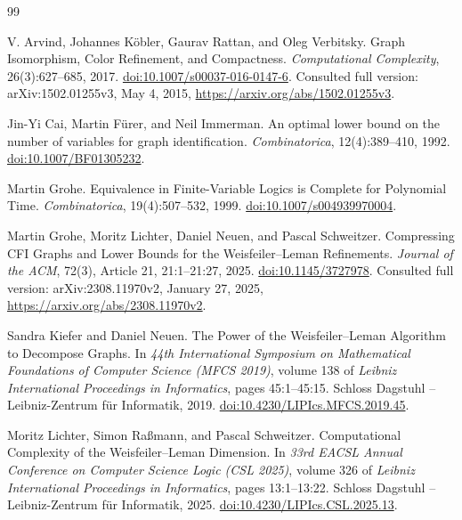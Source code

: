 \begin{thebibliography}{99}

V. Arvind, Johannes K\"obler, Gaurav Rattan, and Oleg Verbitsky.
\newblock Graph Isomorphism, Color Refinement, and Compactness.
\newblock \emph{Computational Complexity}, 26(3):627--685, 2017.
\newblock
\href{https://doi.org/10.1007/s00037-016-0147-6}{doi:10.1007/s00037-016-0147-6}.
\newblock Consulted full version: arXiv:1502.01255v3, May 4, 2015,
\url{https://arxiv.org/abs/1502.01255v3}.

Jin-Yi Cai, Martin F\"urer, and Neil Immerman.
\newblock An optimal lower bound on the number of variables for graph
identification.
\newblock \emph{Combinatorica}, 12(4):389--410, 1992.
\newblock \href{https://doi.org/10.1007/BF01305232}{doi:10.1007/BF01305232}.

Martin Grohe.
\newblock Equivalence in Finite-Variable Logics is Complete for
Polynomial Time.
\newblock \emph{Combinatorica}, 19(4):507--532, 1999.
\newblock
\href{https://doi.org/10.1007/s004939970004}{doi:10.1007/s004939970004}.

Martin Grohe, Moritz Lichter, Daniel Neuen, and Pascal Schweitzer.
\newblock Compressing CFI Graphs and Lower Bounds for the
Weisfeiler--Leman Refinements.
\newblock \emph{Journal of the ACM}, 72(3), Article 21, 21:1--21:27, 2025.
\newblock \href{https://doi.org/10.1145/3727978}{doi:10.1145/3727978}.
\newblock Consulted full version: arXiv:2308.11970v2, January 27, 2025,
\url{https://arxiv.org/abs/2308.11970v2}.

Sandra Kiefer and Daniel Neuen.
\newblock The Power of the Weisfeiler--Leman Algorithm to Decompose Graphs.
\newblock In \emph{44th International Symposium on Mathematical Foundations
of Computer Science (MFCS 2019)}, volume 138 of \emph{Leibniz International
Proceedings in Informatics}, pages 45:1--45:15.
Schloss Dagstuhl -- Leibniz-Zentrum f\"ur Informatik, 2019.
\newblock
\href{https://doi.org/10.4230/LIPIcs.MFCS.2019.45}{doi:10.4230/LIPIcs.MFCS.2019.45}.

Moritz Lichter, Simon Ra\ss mann, and Pascal Schweitzer.
\newblock Computational Complexity of the Weisfeiler--Leman Dimension.
\newblock In \emph{33rd EACSL Annual Conference on Computer Science Logic
(CSL 2025)}, volume 326 of \emph{Leibniz International Proceedings in
Informatics}, pages 13:1--13:22.
Schloss Dagstuhl -- Leibniz-Zentrum f\"ur Informatik, 2025.
\newblock
\href{https://doi.org/10.4230/LIPIcs.CSL.2025.13}{doi:10.4230/LIPIcs.CSL.2025.13}.


\end{thebibliography}
